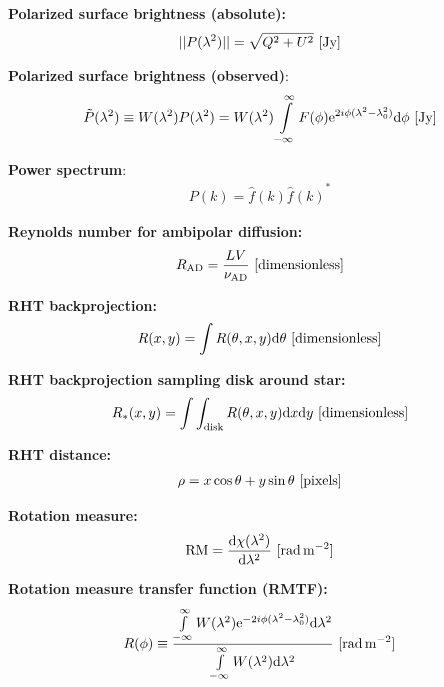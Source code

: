 \documentclass[a4paper,11pt]{article}
\begin{document}
{\noindent}\textbf{Polarized surface brightness (absolute):}
\begin{align*}
\lvert\lvert P(\lambda^2) \rvert\rvert = \sqrt{Q^2+U^2} ~ [\rm Jy]
\end{align*}

{\noindent}\textbf{Polarized surface brightness (observed)}:
\begin{align*}
\tilde{P}(\lambda^2) \equiv W(\lambda^2)P(\lambda^2) = W(\lambda^2) \int\limits_{-\infty}^\infty F(\phi)\mathrm{e}^{2i\phi(\lambda^2-\lambda_0^2)}\mathrm{d}\phi ~ [\rm Jy]
\end{align*}

{\noindent}\textbf{Power spectrum}:
\begin{align*}
    P(k) = \hat{f}(k){\hat{f}(k)}^*
\end{align*}

{\noindent}\textbf{Reynolds number for ambipolar diffusion:}
\begin{align*}
    R_\mathrm{AD} = \dfrac{LV}{\nu_\mathrm{AD}} ~ [{\rm dimensionless}]
\end{align*}

{\noindent}\textbf{RHT backprojection:}
\begin{align*}
    R(x,y) = \int R(\theta,x,y)\mathrm{d}\theta ~ [{\rm dimensionless}]
\end{align*}

{\noindent}\textbf{RHT backprojection sampling disk around star:}
\begin{align*}
    R_*(x,y) = \int\int_\mathrm{disk} R(\theta,x,y)\mathrm{d}x\mathrm{d}y ~ [{\rm dimensionless}]
\end{align*}

{\noindent}\textbf{RHT distance:}
\begin{align*}
    \rho = x\cos\theta+y\sin\theta ~ [{\rm pixels}]
\end{align*}

{\noindent}\textbf{Rotation measure:}
\begin{align*}
{\rm RM} = \dfrac{\mathrm{d}\chi(\lambda^2)}{\mathrm{d}\lambda^2} ~ [{\rm rad\,m^{-2}}]
\end{align*}

{\noindent}\textbf{Rotation measure transfer function (RMTF):}
\begin{align*}
R(\phi) \equiv \dfrac{\int\limits_{-\infty}^\infty W(\lambda^2)\mathrm{e}^{-2i\phi(\lambda^2-\lambda_0^2)}\mathrm{d}\lambda^2}{\int\limits_{-\infty}^\infty W(\lambda^2)\mathrm{d}\lambda^2} ~ [{\rm rad\,m^{-2}}]
\end{align*}
\end{document}
